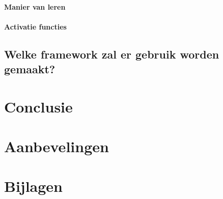 \documentclass{article}
\begin{document}
\paragraph{Manier van leren}
\paragraph{Activatie functies}
\subsection{Welke framework zal er gebruik worden gemaakt?}



\section{Conclusie}

\section{Aanbevelingen}
\section{Bijlagen}
\newpage

\newpage




\end{document}
